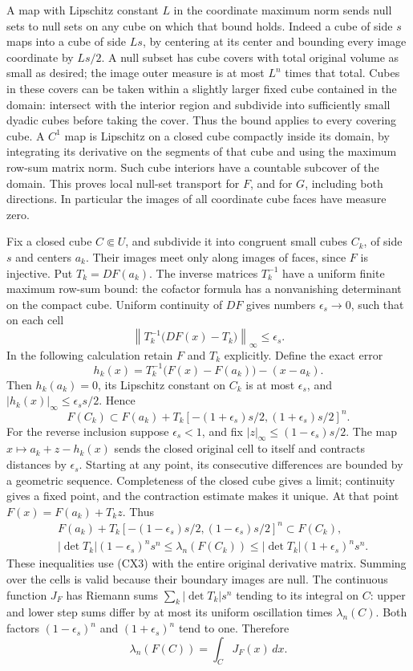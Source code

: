 \documentclass[
  11pt,
]{article}
\begin{document}
A map with Lipschitz constant \(L\) in the coordinate maximum norm sends
null sets to null sets on any cube on which that bound holds. Indeed a
cube of side \(s\) maps into a cube of side \(Ls\), by centering at its
center and bounding every image coordinate by \(Ls/2\). A null subset
has cube covers with total original volume as small as desired; the
image outer measure is at most \(L^n\) times that total. Cubes in these
covers can be taken within a slightly larger fixed cube contained in the
domain: intersect with the interior region and subdivide into
sufficiently small dyadic cubes before taking the cover. Thus the bound
applies to every covering cube. A \(C^1\) map is Lipschitz on a closed
cube compactly inside its domain, by integrating its derivative on the
segments of that cube and using the maximum row-sum matrix norm. Such
cube interiors have a countable subcover of the domain. This proves
local null-set transport for \(F\), and for \(G\), including both
directions. In particular the images of all coordinate cube faces have
measure zero.

Fix a closed cube \(C\Subset U\), and subdivide it into congruent small
cubes \(C_k\), of side \(s\) and centers \(a_k\). Their images meet only
along images of faces, since \(F\) is injective. Put \(T_k=DF(a_k)\).
The inverse matrices \(T_k^{-1}\) have a uniform finite maximum row-sum
bound: the cofactor formula has a nonvanishing determinant on the
compact cube. Uniform continuity of \(DF\) gives numbers
\(\epsilon_s\to0\), such that on each cell \[
 \left\|T_k^{-1}\bigl(DF(x)-T_k\bigr)\right\|_\infty
 \leq\epsilon_s .
\] In the following calculation retain \(F\) and \(T_k\) explicitly.
Define the exact error \[
 h_k(x)=T_k^{-1}\bigl(F(x)-F(a_k)\bigr)-(x-a_k).
\] Then \(h_k(a_k)=0\), its Lipschitz constant on \(C_k\) is at most
\(\epsilon_s\), and \(|h_k(x)|_\infty\leq\epsilon_s s/2\). Hence \[
 F(C_k)\subset
 F(a_k)+T_k[-(1+\epsilon_s)s/2,(1+\epsilon_s)s/2]^n .
\] For the reverse inclusion suppose \(\epsilon_s<1\), and fix
\(|z|_\infty\leq(1-\epsilon_s)s/2\). The map \(x\mapsto a_k+z-h_k(x)\)
sends the closed original cell to itself and contracts distances by
\(\epsilon_s\). Starting at any point, its consecutive differences are
bounded by a geometric sequence. Completeness of the closed cube gives a
limit; continuity gives a fixed point, and the contraction estimate
makes it unique. At that point \(F(x)=F(a_k)+T_kz\). Thus \[
 \begin{split}
 &F(a_k)+T_k[-(1-\epsilon_s)s/2,(1-\epsilon_s)s/2]^n
       \subset F(C_k),\\
 &|\det T_k|(1-\epsilon_s)^n s^n
       \leq\lambda_n(F(C_k))
       \leq|\det T_k|(1+\epsilon_s)^n s^n .
 \end{split}                                                   \tag{CX4}
\] These inequalities use (CX3) with the entire original derivative
matrix. Summing over the cells is valid because their boundary images
are null. The continuous function \(J_F\) has Riemann sums
\(\sum_k|\det T_k|s^n\) tending to its integral on \(C\): upper and
lower step sums differ by at most its uniform oscillation times
\(\lambda_n(C)\). Both factors \((1-\epsilon_s)^n\) and
\((1+\epsilon_s)^n\) tend to one. Therefore \[
              \lambda_n(F(C))=\int_C J_F(x)\,dx.               \tag{CX5}
\]
\end{document}
